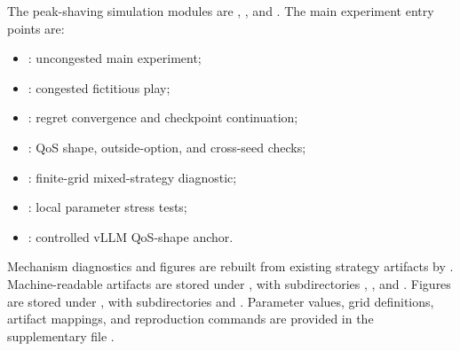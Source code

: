 \documentclass[11pt,a4paper]{article}
\begin{document}
The peak-shaving simulation modules are ,
, and
. The main experiment entry points are:
\begin{itemize}[leftmargin=2em]
  \item {}: uncongested main experiment;
  \item {}: congested fictitious play;
  \item {}: regret convergence and checkpoint continuation;
  \item {}: QoS shape, outside-option, and cross-seed checks;
  \item {}: finite-grid mixed-strategy diagnostic;
  \item {}: local parameter stress tests;
  \item {}: controlled vLLM QoS-shape anchor.
\end{itemize}
Mechanism diagnostics and figures are rebuilt from existing strategy artifacts by
. Machine-readable artifacts are stored under
, with subdirectories , , and
. Figures are stored under , with subdirectories
 and . Parameter values, grid definitions, artifact mappings, and reproduction commands are provided in the supplementary file
.

\small


\end{document}
